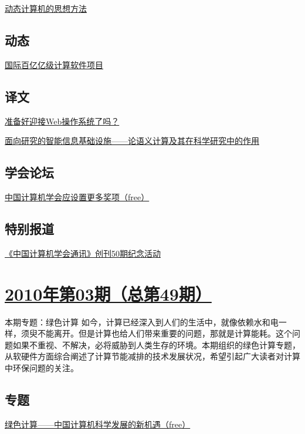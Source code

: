 \documentclass[a4paper]{article}
\begin{document}
\href{http://history.ccf.org.cn/resources/1190201776262/2010/04/23/201004-11.pdf}{动态计算机的思想方法}

\subsection{动态}
\href{http://history.ccf.org.cn/resources/1190201776262/2010/04/23/201004-12.pdf}{国际百亿亿级计算软件项目}

\subsection{译文}
\href{http://history.ccf.org.cn/resources/1190201776262/2010/04/23/201004-13.pdf}{准备好迎接Web操作系统了吗？}

\href{http://history.ccf.org.cn/resources/1190201776262/2010/04/23/201004-14.pdf}{面向研究的智能信息基础设施——论语义计算及其在科学研究中的作用}

\subsection{学会论坛}
\href{http://history.ccf.org.cn/resources/1190201776262/2010/04/23/201004-16.pdf}{中国计算机学会应设置更多奖项（free）}

\subsection{特别报道}
\href{http://history.ccf.org.cn/resources/1190201776262/2010/04/23/201004-15.pdf}{《中国计算机学会通讯》创刊50期纪念活动}


\section{\href{http://history.ccf.org.cn/sites/ccf/jsjtbbd.jsp?contentId=2543828071403}{\textbf{2010年第03期（总第49期）}}}
本期专题：绿色计算 如今，计算已经深入到人们的生活中，就像依赖水和电一样，须臾不能离开。但是计算也给人们带来重要的问题，那就是计算能耗。这个问题如果不重视、不解决，必将威胁到人类生存的环境。本期组织的绿色计算专题，从软硬件方面综合阐述了计算节能减排的技术发展状况，希望引起广大读者对计算中环保问题的关注。
\subsection{专题}
\href{http://history.ccf.org.cn/resources/1190201776262/2010/04/23/20103-2.pdf}{绿色计算——中国计算机科学发展的新机遇（free）}
\end{document}
